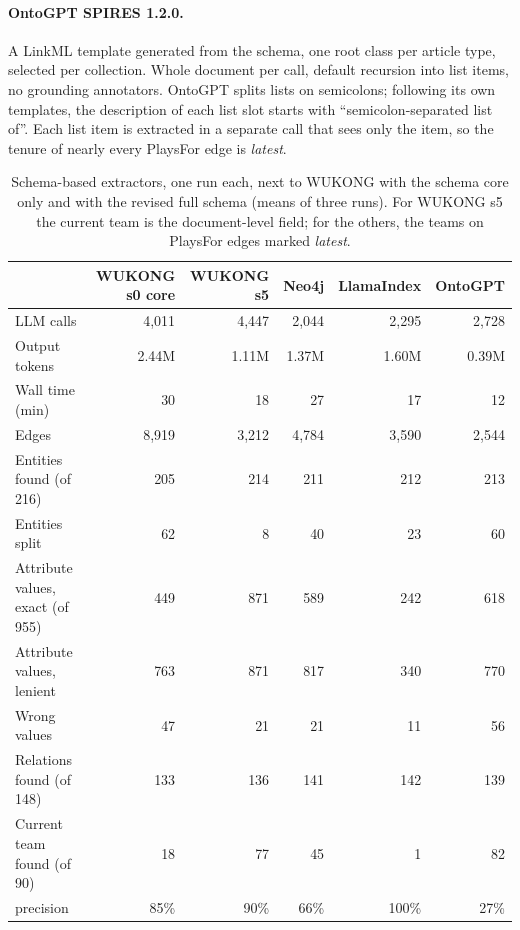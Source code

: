 \documentclass[11pt]{article}
\newcommand{\wk}{WUKONG}
\begin{document}
\paragraph{OntoGPT SPIRES 1.2.0.} A LinkML template generated from the schema, one root class per
article type, selected per collection. Whole document per call, default recursion into list items,
no grounding annotators. OntoGPT splits lists on semicolons; following its own templates, the
description of each list slot starts with ``semicolon-separated list of''. Each list item is
extracted in a separate call that sees only the item, so the tenure of nearly every PlaysFor edge
is \emph{latest}.

\begin{table}[h]
\centering
\small
\setlength{\tabcolsep}{5pt}
\begin{tabular}{lrrrrr}
\toprule
 & \wk{} s0 core & \wk{} s5 & Neo4j & LlamaIndex & OntoGPT \\
\midrule
LLM calls & 4,011 & 4,447 & 2,044 & 2,295 & 2,728 \\
Output tokens & 2.44M & 1.11M & 1.37M & 1.60M & 0.39M \\
Wall time (min) & 30 & 18 & 27 & 17 & 12 \\
Edges & 8,919 & 3,212 & 4,784 & 3,590 & 2,544 \\
\midrule
Entities found (of 216) & 205 & 214 & 211 & 212 & 213 \\
Entities split & 62 & 8 & 40 & 23 & 60 \\
Attribute values, exact (of 955) & 449 & 871 & 589 & 242 & 618 \\
Attribute values, lenient & 763 & 871 & 817 & 340 & 770 \\
Wrong values & 47 & 21 & 21 & 11 & 56 \\
Relations found (of 148) & 133 & 136 & 141 & 142 & 139 \\
\midrule
Current team found (of 90) & 18 & 77 & 45 & 1 & 82 \\
\quad precision & 85\% & 90\% & 66\% & 100\% & 27\% \\
\bottomrule
\end{tabular}
\caption{Schema-based extractors, one run each, next to \wk{} with the schema core only and with
the revised full schema (means of three runs). For \wk{} s5 the current team is the document-level
field; for the others, the teams on PlaysFor edges marked \emph{latest}.}
\label{tab:baselines}
\end{table}
\end{document}
